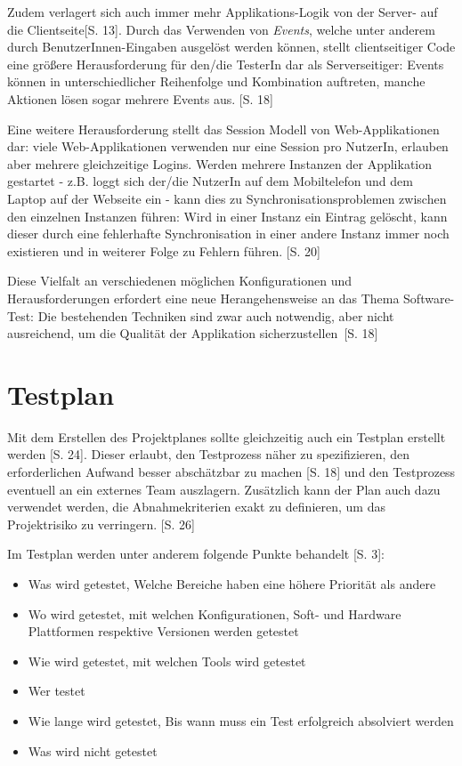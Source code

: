 \documentclass[a4paper,bibtotoc,oneside]{scrbook}
\begin{document}
Zudem verlagert sich auch immer mehr Applikations-Logik von der Server- auf die Clientseite\cite{testing_apps_on_web}[S. 13]. Durch das Verwenden von \emph{Events}, welche unter anderem durch BenutzerInnen-Eingaben ausgelöst werden können, stellt clientseitiger Code eine größere Herausforderung für den/die TesterIn dar als Serverseitiger: Events können in unterschiedlicher Reihenfolge und Kombination auftreten, manche Aktionen lösen sogar mehrere Events aus. \cite{testing_apps_on_web}[S. 18]

Eine weitere Herausforderung stellt das Session Modell von Web-Applikationen dar: viele Web-Applikationen verwenden nur eine Session pro NutzerIn, erlauben aber mehrere gleichzeitige Logins. Werden mehrere Instanzen der Applikation gestartet - z.B. loggt sich der/die NutzerIn auf dem Mobiltelefon und dem Laptop auf der Webseite ein - kann dies zu Synchronisationsproblemen zwischen den einzelnen Instanzen führen: Wird in einer Instanz ein Eintrag gelöscht, kann dieser durch eine fehlerhafte Synchronisation in einer andere Instanz immer noch existieren und in weiterer Folge zu Fehlern führen. \cite{testing_apps_on_web}[S. 20]

Diese Vielfalt an verschiedenen möglichen Konfigurationen und Herausforderungen erfordert eine neue Herangehensweise an das Thema Software-Test: Die bestehenden Techniken sind \glqq zwar auch notwendig, aber nicht ausreichend, um die Qualität der Applikation sicherzustellen\grqq\ \cite{eval_automat_webapp_test}[S. 18]


\chapter{Testplan}
Mit dem Erstellen des Projektplanes sollte gleichzeitig auch ein Testplan erstellt werden \cite{eval_automat_webapp_test}[S. 24]. Dieser erlaubt, den Testprozess näher zu spezifizieren, den erforderlichen Aufwand besser abschätzbar zu machen \cite{test_large_systems}[S. 18] und den Testprozess eventuell an ein externes Team auszlagern. Zusätzlich kann der Plan auch dazu verwendet werden, die Abnahmekriterien exakt zu definieren, um das Projektrisiko zu verringern. \cite{eval_automat_webapp_test}[S. 26]

Im Testplan werden unter anderem folgende Punkte behandelt \cite{test_auto}[S. 3]:

\begin{itemize}
	\item Was wird getestet, Welche Bereiche haben eine höhere Priorität als andere
	\item Wo wird getestet, mit welchen Konfigurationen, Soft- und Hardware Plattformen respektive Versionen werden getestet
	\item Wie wird getestet, mit welchen Tools wird getestet
	\item Wer testet
	\item Wie lange wird getestet, Bis wann muss ein Test erfolgreich absolviert werden
	\item Was wird nicht getestet
\end{itemize}
\end{document}
